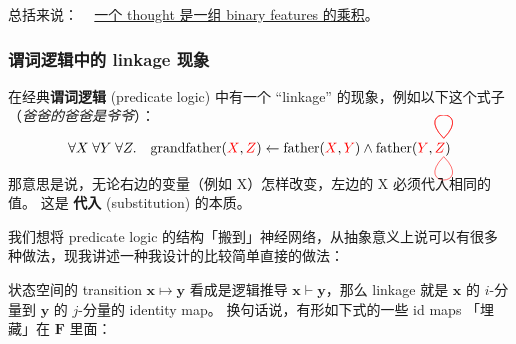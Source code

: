 \documentclass[orivec]{llncs}
\newcommand{\emp}[1]{\textbf{#1}}
\newcommand{\vect}[1]{\boldsymbol{#1}}
\newcommand{\tikzmark}[1]{\tikz[overlay,remember picture] \node (#1) {};}
\begin{document}
总括来说： ~ \uline{一个 thought 是一组 binary features 的乘积}。 %


\subsubsection{谓词逻辑中的 linkage 现象}

在经典\textbf{谓词逻辑} (predicate logic) 中有一个 ``linkage'' 的现象，例如以下这个式子（\textit{爸爸的爸爸是爷爷}）：

\begin{equation}
\forall X \; \forall Y \; \forall Z.  \quad  \text{grandfather}({\color{red}X} \tikzmark{x}, {\color{red}Z} \tikzmark{z}) \leftarrow \text{father}({\color{red}X} \tikzmark{p}, {\color{red}Y} \tikzmark{y}) \wedge \mbox{father}({\color{red}Y} \tikzmark{q}, {\color{red}Z} \tikzmark{r})
\begin{tikzpicture}[overlay,remember picture,out=45,in=135,distance=1.1cm]
  \draw[-,red, transform canvas={shift={(-5pt,10pt)}}] (x.center) to (p.center);
  \draw[-,red, transform canvas={shift={(-5pt,10pt)}}] (y.center) to (q.center);
  \draw[-,red, transform canvas={shift={(-5pt,-3pt)}}, out=-45,in=225] (z.center) to (r.center);
\end{tikzpicture}
\label{linkage-father}
\end{equation}

那意思是说，无论右边的变量（例如 X）怎样改变，左边的 X 必须代入相同的值。 这是 \emp{代入} (substitution) 的本质。



我们想将 predicate logic 的结构「搬到」神经网络，从抽象意义上说可以有很多种做法，现我讲述一种我设计的比较简单直接的做法：  

状态空间的 transition $\vect{x} \mapsto \vect{y}$ 看成是逻辑推导 $\vect{x} \vdash \vect{y}$，那么 linkage 就是 $\vect{x}$ 的 $i$-分量到 $\vect{y}$ 的 $j$-分量的 identity map。 换句话说，有形如下式的一些 id maps 「埋藏」在 $\vect{F}$ 里面：
\end{document}
